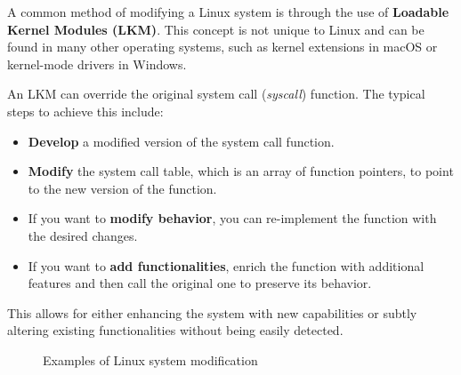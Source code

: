 A common method of modifying a Linux system is through the use of \textbf{Loadable Kernel Modules (LKM)}. This concept is not unique to Linux and can be found in many other operating systems, such as kernel extensions in macOS or kernel-mode drivers in Windows.

An LKM can override the original system call (\textit{syscall}) function. The typical steps to achieve this include:

\begin{itemize}[itemsep=0pt]
    \item \textbf{Develop} a modified version of the system call function.
    \item \textbf{Modify} the system call table, which is an array of function pointers, to point to the new version of the function.
    \item If you want to \textbf{modify behavior}, you can re-implement the function with the desired changes.
    \item If you want to \textbf{add functionalities}, enrich the function with additional features and then call the original one to preserve its behavior.
\end{itemize}

This allows for either enhancing the system with new capabilities or subtly altering existing functionalities without being easily detected.
\begin{figure}[!ht]
    \centering
    \fboxsep=2mm%
    \fboxrule=1pt%
    \caption{Examples of Linux system modification}
    \label{fig:linux_sys_modification}
\end{figure}
